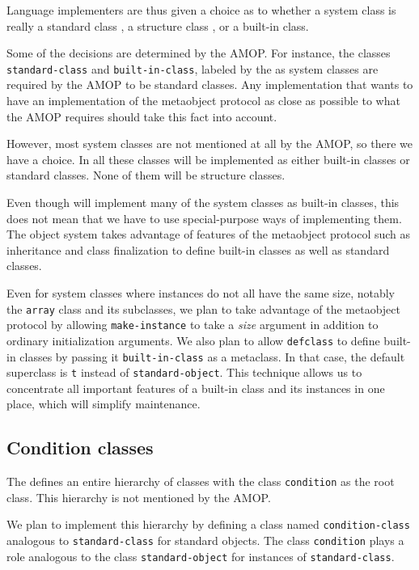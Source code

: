 Language implementers are thus given a choice as to whether a system
class is really a standard class
, a structure class 
, or a built-in class.

Some of the decisions are determined by the AMOP.  For instance, the
classes \texttt{standard-class} and \texttt{built-in-class}, labeled
by the \hs{} as system classes are required by the AMOP to be
standard classes.  Any implementation that wants to have an
implementation of the metaobject protocol as close as possible to what
the AMOP requires should take this fact into account. 

However, most system classes are not mentioned at all by the AMOP, so
there we have a choice.  In \sysname{} all these classes will be
implemented as either built-in classes or standard classes.  None of
them will be structure classes. 

Even though \sysname{} will implement many of the system classes as
built-in classes, this does not mean that we have to use
special-purpose ways of implementing them.  The \sysname{} object
system takes advantage of features of the metaobject protocol such as
inheritance and class finalization to define built-in classes as well
as standard classes.

Even for system classes where instances do not all have the same size,
notably the \texttt{array} class and its subclasses, we plan to take
advantage of the metaobject protocol by allowing
\texttt{make-instance} to take a \emph{size} argument in addition to
ordinary initialization arguments.  We also plan to allow
\texttt{defclass} to define built-in classes by passing it
\texttt{built-in-class} as a metaclass.  In that case, the default
superclass is \texttt{t} instead of \texttt{standard-object}.  This
technique allows us to concentrate all important features of a
built-in class and its instances in one place, which will simplify
maintenance.

\subsection{Condition classes}
\label{object-system-condition-classes}

The \hs{} defines an entire hierarchy of classes with the class
\texttt{condition} as the root class.  This hierarchy is not mentioned
by the AMOP.  

We plan to implement this hierarchy by defining a class named
\texttt{condition-class} analogous to \texttt{standard-class} for
standard objects.  The class \texttt{condition} plays a role analogous
to the class \texttt{standard-object} for instances of
\texttt{standard-class}. 

